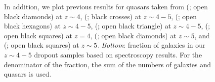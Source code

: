 \documentclass[]{pasj01}
\begin{document}
\begin{figure}
{In addition, 
we plot previous results for quasars taken from 
 (; open black diamonds) at $z \sim 4$, 
 (; black crosses) at $z \sim 4-5$, 
 (; open black hexagons) at $z \sim 4-5$, 
 (; open black triangle) at $z \sim 4-5$, 
 (; open black squares) at $z=4$, 
 (; open black diamonds) at $z \sim 5$,  
and 
 (; open black squares) at $z \sim 5$. 
\textit{Bottom}: 
fraction of galaxies in our $z \sim 4-5$ dropout samples 
based on spectroscopy results. 
For the denominator of the fraction, 
the sum of the numbers of galaxies and quasars is used. 
}\label{fig:UVLF_wAGN}
\end{figure}
\end{document}
